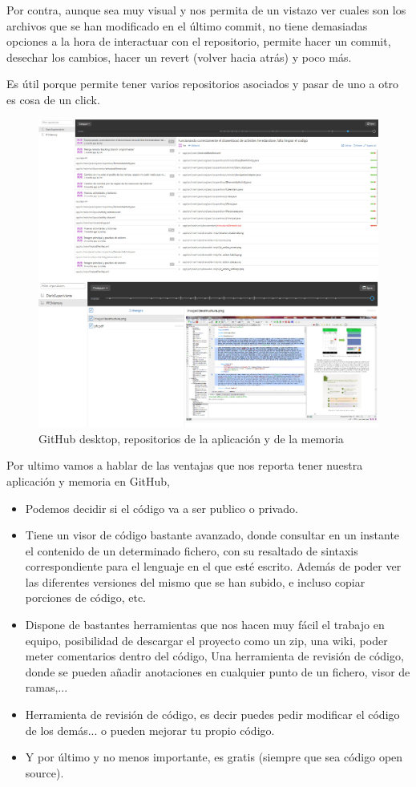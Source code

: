 \documentclass[../pfc.tex]{subfiles}
\begin{document}
	Por contra, aunque sea muy visual y nos permita de un vistazo ver cuales son los archivos que se han modificado en el último commit, no tiene demasiadas opciones a la hora de interactuar con el repositorio, permite hacer un commit, desechar los cambios, hacer un revert (volver hacia atrás) y poco más.
	
	Es útil porque permite tener varios repositorios asociados y pasar de uno a otro es cosa de un click.
	

	\begin{figure}[H]
		\centering
		\includegraphics[width=1\linewidth]{../images/repositoriosGitHub}
		\caption{GitHub desktop, repositorios de la aplicación y de la memoria}
		\label{fig:ghdesktopA}
	\end{figure}

	Por ultimo vamos a hablar de las ventajas que nos reporta tener nuestra aplicación y memoria en GitHub, 
	\begin{itemize}
		\item Podemos decidir si el código va a ser publico o privado.
		\item Tiene un visor de código bastante avanzado, donde consultar en un instante el contenido de un determinado fichero, con su resaltado de sintaxis correspondiente para el lenguaje en el que esté escrito.
		Además de poder ver las diferentes versiones del mismo que se han subido, e incluso copiar porciones de código, etc.
		\item Dispone de bastantes herramientas que nos hacen muy fácil el trabajo en equipo, posibilidad de descargar el proyecto como un zip, una wiki, poder meter comentarios dentro del código, Una herramienta de revisión de código, donde se pueden añadir anotaciones en cualquier punto de un fichero, visor de ramas,...
		\item Herramienta de revisión de código, es decir puedes pedir modificar el código de los demás... o pueden mejorar tu propio código.
		\item Y por último y no menos importante, es gratis (siempre que sea código open source).
	\end{itemize}
\end{document}
